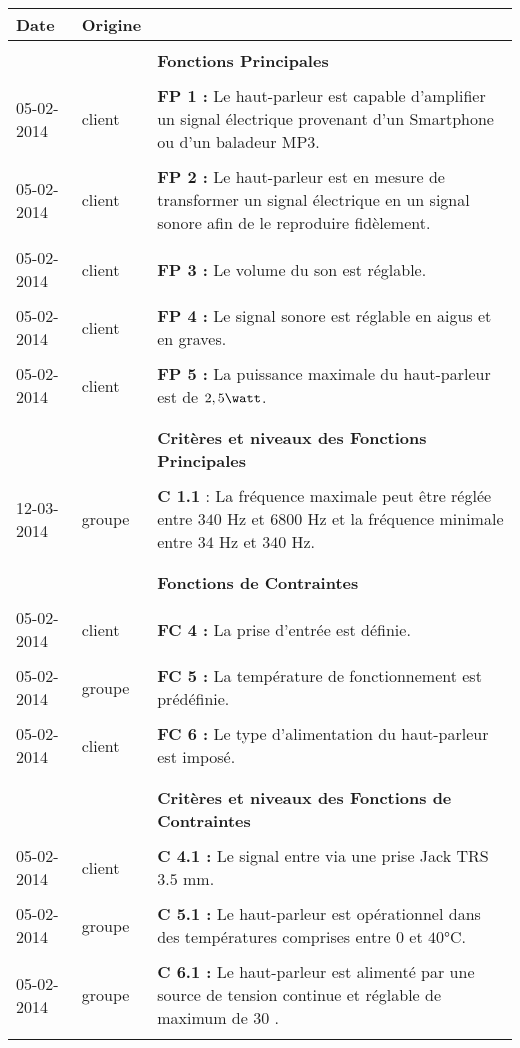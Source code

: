 \documentclass[a4paper, 11pt]{article}
\begin{document}
\begin{tabular}{|p{2cm}|p{1.5cm}|p{13.2cm}|}
 		\textbf{Date} & \textbf{Origine} & \\
 \hline
 	& &\\
		& & \textbf{Fonctions Principales} \\
 	& &\\
		05-02-2014 & client & \textbf{FP 1 :} Le haut-parleur est capable d’amplifier un signal électrique provenant d’un Smartphone ou d’un baladeur MP3.\\
	& &\\
		05-02-2014 & client & \textbf{FP 2 :} Le haut-parleur est en mesure de transformer un signal électrique en un signal sonore afin de le reproduire fidèlement.  \\
	& &\\
		05-02-2014 & client & \textbf{FP 3 :} Le volume du son est réglable.\\
	& &\\
		05-02-2014 & client & \textbf{FP 4 :} Le signal sonore est réglable en aigus et en graves.\\
	& &\\
		05-02-2014 & client & \textbf{FP 5 :} La puissance maximale du haut-parleur est de $2,5  \watt$.\\
	& &\\
\hline
	 & &\\
	 	& & \textbf{Critères et niveaux des Fonctions Principales} \\
	 & &\\
	 	12-03-2014 & groupe & \textbf{C 1.1} : La fréquence maximale peut être réglée entre $340$ Hz et $6800$ Hz et la fréquence minimale entre $34$ Hz et $340$ Hz.\\
	 & &\\
\hline
	 & &\\
	 & & \textbf{ Fonctions de Contraintes}\\
	 & &\\
		05-02-2014 & client & \textbf{FC 4 :} La prise d’entrée est définie.\\
	 & &\\
		05-02-2014 & groupe & \textbf{FC 5 :} La température de fonctionnement est prédéfinie.\\
	 & &\\
		05-02-2014 & client & \textbf{FC 6 :} Le type d’alimentation du haut-parleur est imposé.\\
	 & &\\
\hline
	& &\\
		& & \textbf{ Critères et niveaux des Fonctions de Contraintes}\\
	& &\\
	 	05-02-2014 & client & \textbf{C 4.1 :} Le signal entre via une prise Jack TRS $3.5$ mm.\\
	& &\\
		05-02-2014 & groupe & \textbf{C 5.1 :} Le haut-parleur est opérationnel dans des températures comprises entre $0$ et $40$°C.\\
	& &\\
		05-02-2014 & groupe & \textbf{C 6.1 :} Le haut-parleur est alimenté par une source de tension continue et réglable de maximum de $30$ \volt.\\
	 & &\\
\hline
 \end{tabular}
 
\end{document}
